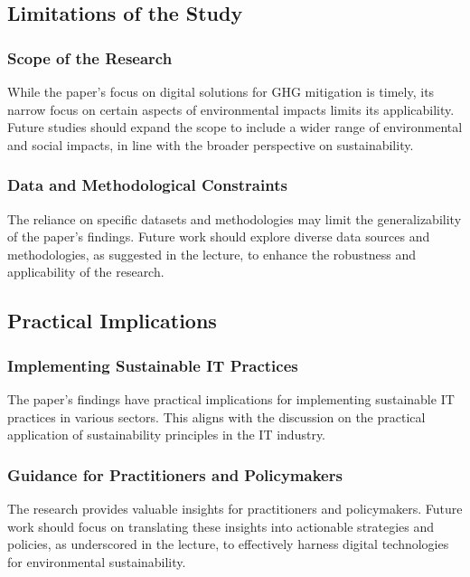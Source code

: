 \documentclass[conference,compsoc]{IEEEtran}
\begin{document}
\subsection{Limitations of the Study}

\subsubsection{Scope of the Research}

While the paper's focus on digital solutions for GHG mitigation is timely, its narrow focus on certain aspects of environmental impacts limits its applicability. Future studies should expand the scope to include a wider range of environmental and social impacts, in line with the  broader perspective on sustainability.

\subsubsection{Data and Methodological Constraints}

The reliance on specific datasets and methodologies may limit the generalizability of the paper's findings. Future work should explore diverse data sources and methodologies, as suggested in the lecture, to enhance the robustness and applicability of the research.

\subsection{Practical Implications}

\subsubsection{Implementing Sustainable IT Practices}

The paper's findings have practical implications for implementing sustainable IT practices in various sectors. This aligns with the  discussion on the practical application of sustainability principles in the IT industry.

\subsubsection{Guidance for Practitioners and Policymakers}

The research provides valuable insights for practitioners and policymakers. Future work should focus on translating these insights into actionable strategies and policies, as underscored in the lecture, to effectively harness digital technologies for environmental sustainability.
\end{document}
